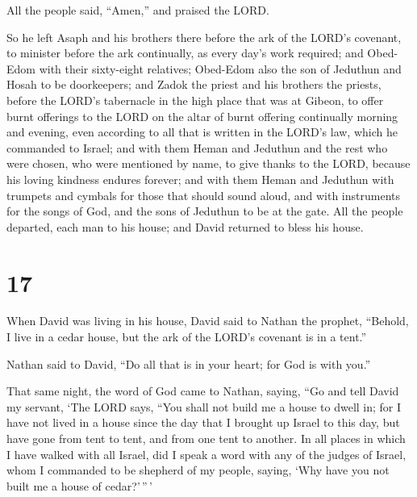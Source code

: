All the people said, ``Amen,'' and praised the LORD.

 So he left Asaph and his brothers there before the ark
of the LORD's covenant, to minister before the ark continually, as every
day's work required;  and Obed-Edom with their
sixty-eight relatives; Obed-Edom also the son of Jeduthun and Hosah to
be doorkeepers;  and Zadok the priest and his brothers
the priests, before the LORD's tabernacle in the high place that was at
Gibeon,  to offer burnt offerings to the LORD on the
altar of burnt offering continually morning and evening, even according
to all that is written in the LORD's law, which he commanded to Israel;
 and with them Heman and Jeduthun and the rest who were
chosen, who were mentioned by name, to give thanks to the LORD, because
his loving kindness endures forever;  and with them Heman
and Jeduthun with trumpets and cymbals for those that should sound
aloud, and with instruments for the songs of God, and the sons of
Jeduthun to be at the gate.  All the people departed,
each man to his house; and David returned to bless his house.

\hypertarget{section-16}{%
\section{17}\label{section-16}}

 When David was living in his house, David said to Nathan
the prophet, ``Behold, I live in a cedar house, but the ark of the
LORD's covenant is in a tent.''

 Nathan said to David, ``Do all that is in your heart; for
God is with you.''

 That same night, the word of God came to Nathan, saying,
 ``Go and tell David my servant, `The LORD says, ``You
shall not build me a house to dwell in;  for I have not
lived in a house since the day that I brought up Israel to this day, but
have gone from tent to tent, and from one tent to another.
 In all places in which I have walked with all Israel, did
I speak a word with any of the judges of Israel, whom I commanded to be
shepherd of my people, saying, `Why have you not built me a house of
cedar?'\,''\,'

